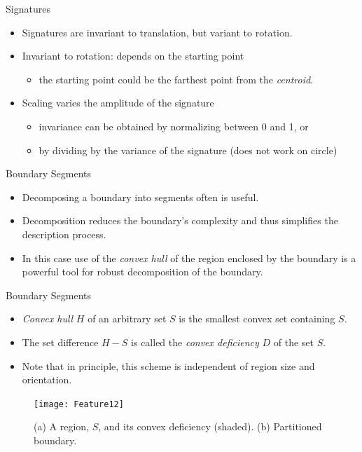 \begin{frame}{Signatures}
\begin{itemize}
\setlength{\itemsep}{12pt}
\item Signatures are invariant to translation, but variant to rotation.
\item Invariant to rotation: depends on the starting point
\begin{itemize}
\item the starting point could be the farthest point from the \textit{\color{mycolor1}centroid}. 
\end{itemize}
\item Scaling varies the amplitude of the signature
\begin{itemize}
\item invariance can be obtained by normalizing between 0 and 1, or
\item by dividing by the variance of the signature (does not work on circle)
\end{itemize}
\end{itemize}
\end{frame}

\begin{frame}{Boundary Segments}
\begin{itemize}
\item Decomposing a boundary into segments often 
is useful.
\item Decomposition reduces the boundary's 
complexity and thus simplifies the description 
process.
\item In this case use of the \textit{\color{mycolor1}convex hull} of the region 
enclosed by the boundary is a powerful tool for 
robust decomposition of the boundary.
\end{itemize}
\end{frame}

\begin{frame}{Boundary Segments}
\begin{itemize}
\item \textit{\color{mycolor1} Convex hull} $H$ of an arbitrary set $S$ is the 
smallest convex set containing $S$.
\item The set difference $H-S$ is called the \textit{\color{mycolor1} convex 
deficiency} $D$ of the set $S$.
\item Note that in principle, this scheme is 
independent of region size and orientation.
\end{itemize}
\begin{figure}
\texttt{[image: Feature12]}
\caption{(a) A region, $S$, and its convex deficiency (shaded). (b) Partitioned boundary.}
\end{figure}
\end{frame}


